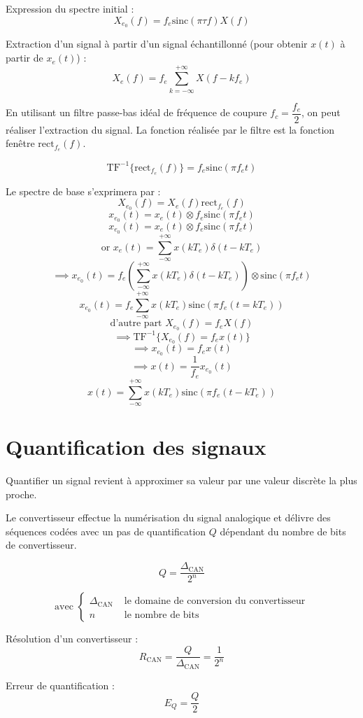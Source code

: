 \documentclass[a4paper,12pt]{report}
\begin{document}
Expression du spectre initial :
\[ X_{e_0}(f) = f_e \mathrm{sinc}(\pi \tau f) X(f) \]

Extraction d'un signal à partir d'un signal échantillonné (pour obtenir $x(t)$ à partir de $x_e(t)$) :
\[ X_e(f) = f_e \sum_{k=-\infty}^{+\infty} X(f-kf_e) \]

En utilisant un filtre passe-bas idéal de fréquence de coupure $f_c = \dfrac{f_e}{2}$, on peut réaliser l'extraction du signal. La fonction réalisée par le filtre est la fonction fenêtre $\mathrm{rect}_{f_e}(f)$.

\begin{defi}
    \[ \mathrm{TF}^{-1} \{ \mathrm{rect}_{f_e}(f) \} = f_e \mathrm{sinc}(\pi f_e t) \]
\end{defi}

Le spectre de base s'exprimera par :
\[ X_{e_0}(f) = X_e(f) \mathrm{rect}_{f_e}(f) \]
\[ x_{e_0}(t) = x_e(t) \otimes f_e \mathrm{sinc}(\pi f_et) \]
\[ x_{e_0}(t) = x_e(t) \otimes f_e \mathrm{sinc}(\pi f_e t) \]
\[ \text{or } x_e(t) = \sum_{-\infty}^{+\infty} x(kT_e) \delta(t-kT_e) \]
\[ \implies x_{e_0}(t) = f_e (\sum_{-\infty}^{+\infty} x(kT_e) \delta(t-kT_e)) \otimes \mathrm{sinc}(\pi f_e t) \]
\[ x_{e_0}(t) = f_e \sum_{-\infty}^{+\infty} x(kT_e) \mathrm{sinc}(\pi f_e (t=kT_e)) \]
\[ \text{d'autre part } X_{e_0}(f) = f_e X(f) \]
\[ \implies \mathrm{TF}^{-1} \{ X_{e_0}(f) = f_e x(t) \} \]
\[ \implies x_{e_0}(t) = f_e x(t) \]
\[ \implies x(t) = \dfrac{1}{f_e} x_{e_0}(t) \]
\[ x(t) = \sum_{-\infty}^{+\infty} x(kT_e) \mathrm{sinc}(\pi f_e (t-kT_e)) \]

\section{Quantification des signaux}

Quantifier un signal revient à approximer sa valeur par une valeur discrète la plus proche.

\begin{defi}
    Le convertisseur effectue la numérisation du signal analogique et délivre des séquences codées avec un pas de quantification $Q$ dépendant du nombre de bits de convertisseur.

    \[ Q = \dfrac{\Delta_{\mathrm{CAN}}}{2^n} \]

    \[ \text{avec } \begin{cases}
        \Delta_{\mathrm{CAN}} & \text{ le domaine de conversion du convertisseur} \\
        n & \text{ le nombre de bits}
    \end{cases} \]

    Résolution d'un convertisseur :
    \[ R_\mathrm{CAN} = \dfrac{Q}{\Delta_\mathrm{CAN}} = \dfrac{1}{2^n} \]

    Erreur de quantification :
    \[ E_Q = \dfrac{Q}{2} \]
\end{defi}
\end{document}
